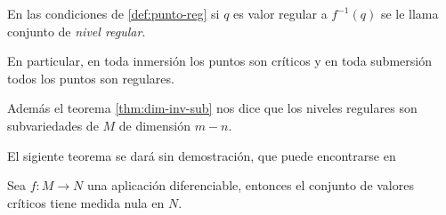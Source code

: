 \documentclass[../VD.tex]{subfiles}
\begin{document}
\begin{definition}
En las condiciones de \cref{def:punto-reg} si \(q\) es valor regular a \(f^{-1}(q)\) se le llama conjunto de \emph{nivel regular}.
\end{definition}

\begin{remark}
En particular, en toda inmersión los puntos son críticos y en toda submersión todos los puntos son regulares.

Además el teorema \ref{thm:dim-inv-sub}
nos dice que los niveles regulares son subvariedades de \(M\) de dimensión \(m-n\).
\end{remark}

El sigiente teorema se dará sin demostración, que puede encontrarse en %

\begin{theorem}%
Sea \(f\colon M\to N\) una aplicación diferenciable, entonces el conjunto de valores críticos tiene medida nula en \(N\).
\end{theorem}
\end{document}
